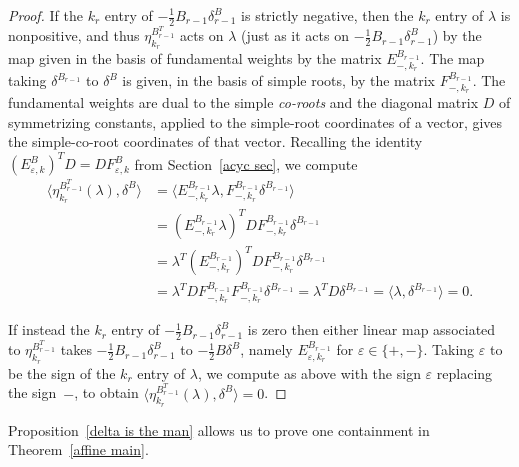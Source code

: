 \documentclass[10pt]{article}
\theoremstyle{definition}
\theoremstyle{remark}
\numberwithin{equation}{section}
\newcommand{\ep}{\varepsilon}
\newcommand{\set}[1]{{\lbrace #1 \rbrace}}
\newcommand{\br}[1]{{\langle #1 \rangle}}
\newcommand{\0}{{\mathbf{0}}}
\newcommand{\symmetrizer}{{D}}
\begin{document}
\begin{proof}
If the $k_r$ entry of $-\frac12B_{r-1}\delta^B_{r-1}$ is strictly negative, then the $k_r$ entry of $\lambda$ is nonpositive, and thus $\eta^{B^T_{r-1}}_{k_r}$ acts on $\lambda$ (just as it acts on $-\frac12B_{r-1}\delta^B_{r-1}$) by the map given in the basis of fundamental weights by the matrix $E_{-,k_r}^{B_{r-1}}$.
The map taking $\delta^{B_{r-1}}$ to $\delta^B$ is given, in the basis of simple roots, by the matrix $F_{-,k_r}^{B_{r-1}}$.
The fundamental weights are dual to the simple \emph{co-roots} and the diagonal matrix $\symmetrizer$ of symmetrizing constants, applied to the simple-root coordinates of a vector, gives the simple-co-root coordinates of that vector.
Recalling the identity $(E_{\ep,k}^B)^T\symmetrizer=\symmetrizer F_{\ep,k}^B$ from Section~\ref{acyc sec}, we compute
\begin{align*}
\br{\eta^{B^T_{r-1}}_{k_r}(\lambda),\delta^B}
&=\br{E_{-,k_r}^{B_{r-1}}\lambda,F_{-,k_r}^{B_{r-1}}\delta^{B_{r-1}}}\\
&=(E_{-,k_r}^{B_{r-1}}\lambda)^T\symmetrizer F_{-,k_r}^{B_{r-1}}\delta^{B_{r-1}}\\
&=\lambda^T(E_{-,k_r}^{B_{r-1}})^T\symmetrizer F_{-,k_r}^{B_{r-1}}\delta^{B_{r-1}}\\
&=\lambda^T\symmetrizer F_{-,k_r}^{B_{r-1}}F_{-,k_r}^{B_{r-1}}\delta^{B_{r-1}}=\lambda^T\symmetrizer\delta^{B_{r-1}}=\br{\lambda,\delta^{B_{r-1}}}=0.
\end{align*}

If instead the $k_r$ entry of $-\frac12B_{r-1}\delta^B_{r-1}$ is zero then either linear map associated to $\eta^{B^T_{r-1}}_{k_r}$ takes $-\frac12B_{r-1}\delta^B_{r-1}$ to $-\frac12B\delta^B$, namely $E_{\ep,k_r}^{B_{r-1}}$ for $\ep\in\set{+,-}$.
Taking $\ep$ to be the sign of the $k_r$ entry of $\lambda$, we compute as above with the sign $\ep$ replacing the sign~$-$, to obtain $\br{\eta^{B^T_{r-1}}_{k_r}(\lambda),\delta^B}=0$.
\end{proof}

Proposition~\ref{delta is the man} allows us to prove one containment in Theorem~\ref{affine main}.
\end{document}
